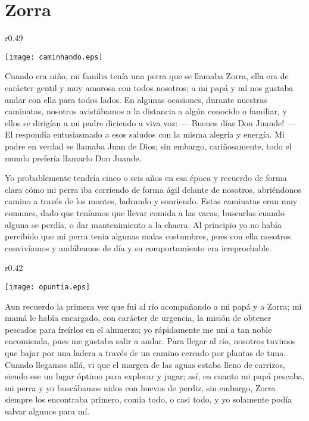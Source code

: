 \cleardoublepage
\newpage
{}
\chapter{Zorra}


\begin{wrapfigure}{r}{0.49\textwidth}
  \begin{center}
  \vspace{-30pt}
    \texttt{[image: caminhando.eps]}
  \end{center}
  \vspace{-20pt}
\end{wrapfigure}
Cuando era niño, mi familia tenía una perra que se llamaba Zorra, ella era de carácter gentil y muy amorosa con todos nosotros; a mi papá y mí nos gustaba andar con ella para todos lados. En algunas ocasiones, durante nuestras caminatas, nosotros avistábamos a la distancia  a algún conocido o familiar, y ellos se dirigían a mi padre diciendo a viva voz: 
--- Buenos días Don Juande! --- 
El respondía entusiasmado a esos saludos con la misma alegría y energía.
Mi padre en verdad se llamaba Juan de Dios; sin embargo, cariñosamente, todo el mundo prefería llamarlo Don Juande.

Yo probablemente tendría cinco o seis años en esa época y recuerdo de forma clara cómo mi perra iba corriendo de forma ágil delante de nosotros, abriéndonos camino a través de los montes, ladrando y sonriendo.
Estas caminatas eran muy comunes, dado que teníamos que llevar comida a las vacas, buscarlas cuando alguna se perdía, o dar mantenimiento a la chacra.
Al principio yo no había percibido que mi perra tenia algunas malas costumbres, pues con ella nosotros convivíamos y andábamos de día y su comportamiento era irreprochable.

\begin{wrapfigure}{r}{0.42\textwidth}
  \begin{center}
  \vspace{-30pt}
    \texttt{[image: opuntia.eps]}
  \end{center}
  \vspace{-20pt}
\end{wrapfigure}
Aun recuerdo la primera vez que fui al río acompañando a mi papá y a Zorra; mi mamá le había encargado, con carácter de urgencia, la misión de obtener pescados para freírlos en el almuerzo; yo rápidamente me uní a tan noble encomienda, pues me gustaba salir a andar.
Para llegar al río, nosotros tuvimos que bajar por una ladera a través de un camino cercado por plantas de tuna. Cuando llegamos allá, vi que el margen de las aguas estaba lleno de carrizos, siendo ese un lugar óptimo para explorar y jugar; así, en cuanto mi papá pescaba, mi perra y yo buscábamos nidos con huevos de perdiz, sin embargo, Zorra siempre los encontraba primero, comía todo, o casi todo, y yo solamente podía salvar algunos para mí. 

